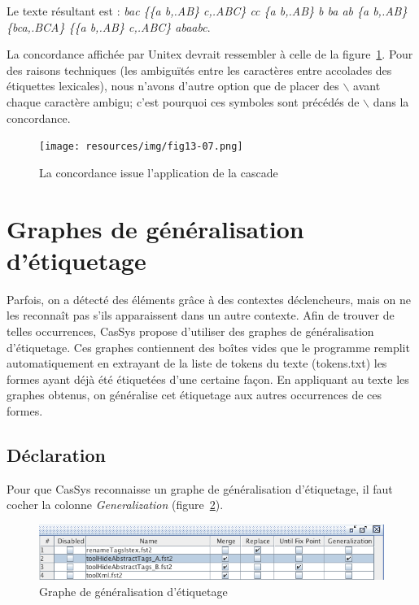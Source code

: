 \bigskip
\noindent Le texte résultant est : \emph{bac \{\{a b,.AB\} c,.ABC\} cc \{a b,.AB\} b ba ab \{a
b,.AB\} \{bca,.BCA\} \{\{a b,.AB\} c,.ABC\} abaabc}.


\bigskip
\noindent La concordance affichée par Unitex devrait ressembler à celle de la figure~\ref{fig13-07}. Pour des raisons techniques (les ambiguïtés entre les
	caractères entre accolades des étiquettes lexicales), nous n'avons d'autre option que de
placer des  $\backslash$ avant chaque caractère ambigu; c'est pourquoi ces symboles sont précédés de
$\backslash$ dans la concordance.

\begin{figure}[!htb]
  \centering
  \texttt{[image: resources/img/fig13-07.png]}
  \caption{La concordance issue l'application de la cascade}
  \label{fig13-07}
\end{figure}

\section{Graphes de g\'{e}n\'{e}ralisation d'\'{e}tiquetage}
\label{graph-generalization}

Parfois, on a détecté des \'{e}l\'{e}ments gr\^{a}ce \`{a} des contextes déclencheurs,
mais on ne les reconna\^{i}t pas s'ils apparaissent dans un autre contexte.
Afin de trouver de telles occurrences, CasSys propose d'utiliser des graphes de
g\'{e}n\'{e}ralisation d'\'{e}tiquetage. Ces graphes contiennent des bo\^{i}tes vides
que le programme remplit automatiquement en extrayant de la liste de tokens du texte
(tokens.txt) les formes ayant déjà été étiquetées d'une certaine façon.
En appliquant au texte les graphes obtenus, on généralise cet étiquetage aux autres
occurrences de ces formes.

\subsection{D\'{e}claration}
Pour que CasSys reconnaisse un graphe de g\'{e}n\'{e}ralisation d'\'{e}tiquetage, il faut
cocher la colonne \emph{Generalization} (figure~\ref{fig12-3}).

\begin{figure}[!htb]
  \centering
  \includegraphics[width=15cm]{resources/img/fig12-3.png}
  \caption{Graphe de g\'{e}n\'{e}ralisation d'\'{e}tiquetage}
  \label{fig12-3}
\end{figure}

